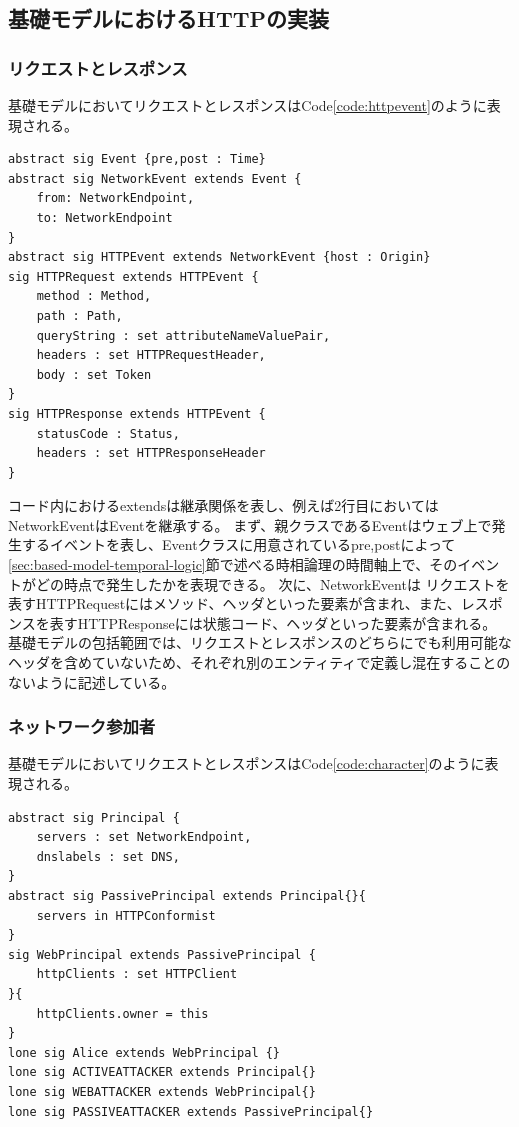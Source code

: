 \documentclass[12pt,a4paper]{jbook}
\begin{document}
\color{red}
\subsection{基礎モデルにおけるHTTPの実装}
\label{sec:based-model-http}

\subsubsection{リクエストとレスポンス}
基礎モデルにおいてリクエストとレスポンスはCode\ref{code:httpevent}のように表現される。
\begin{lstlisting}[caption=HTTPRequest/HTTPResponse, label=code:httpevent]
abstract sig Event {pre,post : Time}
abstract sig NetworkEvent extends Event {
	from: NetworkEndpoint,
	to: NetworkEndpoint
}
abstract sig HTTPEvent extends NetworkEvent {host : Origin}
sig HTTPRequest extends HTTPEvent { 
	method : Method,
	path : Path,
	queryString : set attributeNameValuePair,
	headers : set HTTPRequestHeader,
	body : set Token
}
sig HTTPResponse extends HTTPEvent {
	statusCode : Status,
	headers : set HTTPResponseHeader
}
\end{lstlisting}
コード内におけるextendsは継承関係を表し、例えば2行目においてはNetworkEventはEventを継承する。
まず、親クラスであるEventはウェブ上で発生するイベントを表し、Eventクラスに用意されているpre,postによって\ref{sec:based-model-temporal-logic}節で述べる時相論理の時間軸上で、そのイベントがどの時点で発生したかを表現できる。
次に、NetworkEventは
リクエストを表すHTTPRequestにはメソッド、ヘッダといった要素が含まれ、また、レスポンスを表すHTTPResponseには状態コード、ヘッダといった要素が含まれる。
基礎モデルの包括範囲では、リクエストとレスポンスのどちらにでも利用可能なヘッダを含めていないため、それぞれ別のエンティティで定義し混在することのないように記述している。

\subsubsection{ネットワーク参加者}
基礎モデルにおいてリクエストとレスポンスはCode\ref{code:character}のように表現される。
\begin{lstlisting}[caption=ネットワーク参加者, label=code:character]
abstract sig Principal {
	servers : set NetworkEndpoint,
	dnslabels : set DNS,
}
abstract sig PassivePrincipal extends Principal{}{
	servers in HTTPConformist
}
sig WebPrincipal extends PassivePrincipal {
	httpClients : set HTTPClient
}{
	httpClients.owner = this
}
lone sig Alice extends WebPrincipal {}
lone sig ACTIVEATTACKER extends Principal{}
lone sig WEBATTACKER extends WebPrincipal{}
lone sig PASSIVEATTACKER extends PassivePrincipal{}
\end{lstlisting}
\end{document}
